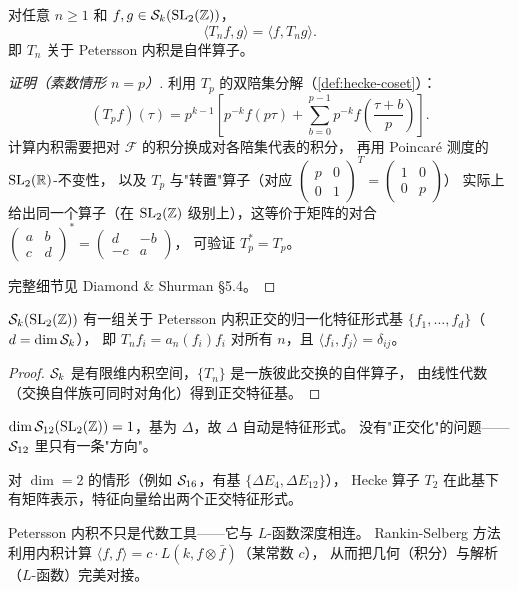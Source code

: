 \begin{theorem}
\label{thm:hecke-selfadjoint}
对任意 $n \geq 1$ 和 $f, g \in \mathcal{S}_k(\mathrm{SL}_2(\mathbb{Z}))$，
\[
  \langle T_n f, g \rangle = \langle f, T_n g \rangle.
\]
即 $T_n$ 关于 Petersson 内积是自伴算子。
\end{theorem}

\begin{proof}[证明（素数情形 $n = p$）]
利用 $T_p$ 的双陪集分解（\cref{def:hecke-coset}）：
\[
  (T_p f)(\tau) = p^{k-1} \left[
    p^{-k} f(p\tau) + \sum_{b=0}^{p-1} p^{-k} f\!\left(\frac{\tau+b}{p}\right)
  \right].
\]
计算内积需要把对 $\mathcal{F}$ 的积分换成对各陪集代表的积分，
再用 Poincaré 测度的 $\mathrm{SL}_2(\mathbb{R})$-不变性，
以及 $T_p$ 与"转置"算子（对应 $\begin{pmatrix}p&0\\0&1\end{pmatrix}^T = \begin{pmatrix}1&0\\0&p\end{pmatrix}$）
实际上给出同一个算子（在 $\mathrm{SL}_2(\mathbb{Z})$ 级别上），这等价于矩阵的对合
$\begin{pmatrix}a&b\\c&d\end{pmatrix}^* = \begin{pmatrix}d&-b\\-c&a\end{pmatrix}$，
可验证 $T_p^* = T_p$。

完整细节见 Diamond \& Shurman §5.4。
\end{proof}

\begin{corollary}[特征形式正交基]
\label{cor:eigenform-basis}
$\mathcal{S}_k(\mathrm{SL}_2(\mathbb{Z}))$ 有一组关于 Petersson 内积正交的归一化特征形式基
$\{f_1, \ldots, f_d\}$（$d = \dim \mathcal{S}_k$），
即 $T_n f_i = a_n(f_i) f_i$ 对所有 $n$，且 $\langle f_i, f_j \rangle = \delta_{ij}$。
\end{corollary}

\begin{proof}
$\mathcal{S}_k$ 是有限维内积空间，$\{T_n\}$ 是一族彼此交换的自伴算子，
由线性代数（交换自伴族可同时对角化）得到正交特征基。
\end{proof}

\begin{example}[$\Sk_{12}$ 的情况]
$\dim \mathcal{S}_{12}(\mathrm{SL}_2(\mathbb{Z})) = 1$，基为 $\Delta$，故 $\Delta$ 自动是特征形式。
没有"正交化"的问题——$\Sk_{12}$ 里只有一条"方向"。

对 $\dim = 2$ 的情形（例如 $\mathcal{S}_{16}$，有基 $\{\Delta E_4, \Delta E_{12}\}$），
Hecke 算子 $T_2$ 在此基下有矩阵表示，特征向量给出两个正交特征形式。
\end{example}

\begin{remark}
Petersson 内积不只是代数工具——它与 $L$-函数深度相连。
Rankin-Selberg 方法利用内积计算
$\langle f, f \rangle = c \cdot L(k, f \otimes \bar{f})$（某常数 $c$），
从而把几何（积分）与解析（$L$-函数）完美对接。
\end{remark}

